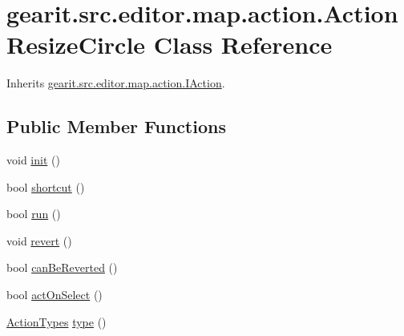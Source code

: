 \hypertarget{classgearit_1_1src_1_1editor_1_1map_1_1action_1_1_action_resize_circle}{\section{gearit.\+src.\+editor.\+map.\+action.\+Action\+Resize\+Circle Class Reference}
\label{classgearit_1_1src_1_1editor_1_1map_1_1action_1_1_action_resize_circle}
}


Inherits \hyperlink{interfacegearit_1_1src_1_1editor_1_1map_1_1action_1_1_i_action}{gearit.\+src.\+editor.\+map.\+action.\+I\+Action}.

\subsection*{Public Member Functions}
\begin{DoxyCompactItemize}
\item 
void \hyperlink{classgearit_1_1src_1_1editor_1_1map_1_1action_1_1_action_resize_circle_a98b74d3247a60a60fe5896b073f50cda}{init} ()
\item 
bool \hyperlink{classgearit_1_1src_1_1editor_1_1map_1_1action_1_1_action_resize_circle_aa32456e09b0a2a36c99c0f02a1cfafb7}{shortcut} ()
\item 
bool \hyperlink{classgearit_1_1src_1_1editor_1_1map_1_1action_1_1_action_resize_circle_a3bf7fbab83a5a50c208583a276957c5e}{run} ()
\item 
void \hyperlink{classgearit_1_1src_1_1editor_1_1map_1_1action_1_1_action_resize_circle_a308a4b5e90e8627a26b3448a257be3f0}{revert} ()
\item 
bool \hyperlink{classgearit_1_1src_1_1editor_1_1map_1_1action_1_1_action_resize_circle_abe53e28bed8950ba5660ab22feaf5bd7}{can\+Be\+Reverted} ()
\item 
bool \hyperlink{classgearit_1_1src_1_1editor_1_1map_1_1action_1_1_action_resize_circle_ae0d7f40a2743a820b19d52e80becc798}{act\+On\+Select} ()
\item 
\hyperlink{namespacegearit_1_1src_1_1editor_1_1map_1_1action_af036712a7d960b13d1e31954e65c00e3}{Action\+Types} \hyperlink{classgearit_1_1src_1_1editor_1_1map_1_1action_1_1_action_resize_circle_ae5b2e0e1328803e3ba100f1e90107dae}{type} ()
\end{DoxyCompactItemize}


